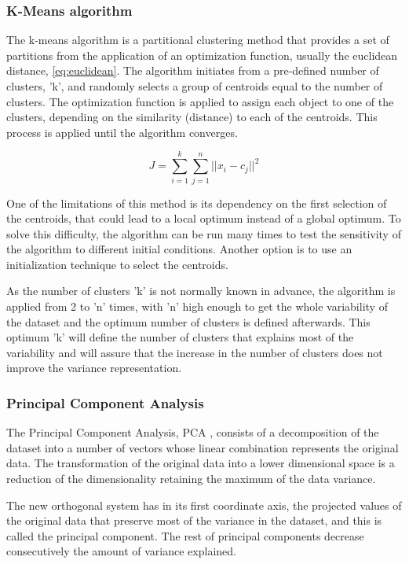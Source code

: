 \subsubsection{K-Means algorithm}

The k-means algorithm is a partitional clustering method that provides a set of partitions from the application of an optimization function, usually the euclidean distance, \ref{eq:euclidean}. The algorithm initiates from a pre-defined number of clusters, 'k', and randomly selects a group of centroids equal to the number of clusters. The optimization function is applied to assign each object to one of the clusters, depending on the similarity (distance) to each of the centroids. This process is applied until the algorithm converges.

\begin{equation}\label{eq:euclidean}
    J =\sum_{i=1}^{k}\sum_{j=1}^{n}{||x_i-c_j||}^2
\end{equation}

One of the limitations of this method is its dependency on the first selection of the centroids, that could lead to a local optimum instead of a global optimum. To solve this difficulty, the algorithm can be run many times to test the sensitivity of the algorithm to different initial conditions. Another option is to use an initialization technique to select the centroids.

As the number of clusters 'k' is not normally known in advance, the algorithm is applied from 2 to 'n' times, with 'n' high enough to get the whole variability of the dataset and the optimum number of clusters is defined afterwards. This optimum 'k' will define the number of clusters that explains most of the variability and will assure that the increase in the number of clusters does not improve the variance representation.

\subsubsection{Principal Component Analysis}

The Principal Component Analysis, PCA \cite*{jolliffe2011}, consists of a decomposition of the dataset into a number of vectors whose linear combination represents the original data. The transformation of the original data into a lower dimensional space is a reduction of the dimensionality retaining the maximum of the data variance.

The new orthogonal system has in its first coordinate axis, the projected values of the original data that preserve most of the variance in the dataset, and this is called the principal component. The rest of principal components decrease consecutively the amount of variance explained.

